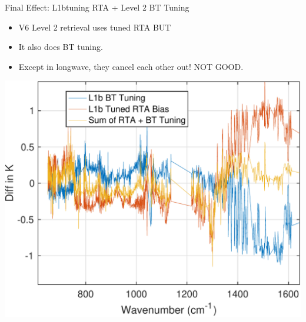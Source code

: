 \documentclass[10pt,t]{beamer}
\begin{document}
\begin{frame}[label={sec:orgcfca8da}]{Final Effect: L1btuning RTA + Level 2 BT Tuning}
\begin{itemize}
\item V6 Level 2 retrieval uses tuned RTA \alert{BUT}
\item It also does BT tuning.
\item Except in longwave, they cancel each other out!  NOT GOOD.
\end{itemize}
\begin{center}
\includegraphics[width=0.65\linewidth]{./l1b_bttuning_l1b_tunedbias_added.pdf}
\end{center}
\end{frame}
\end{document}
